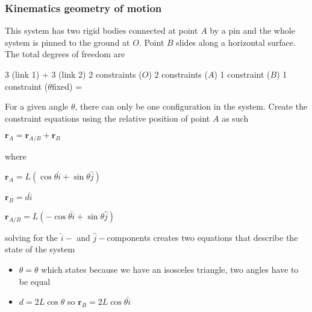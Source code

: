 \documentclass[letterpaper,10pt,english]{sphinxmanual}
\begin{document}


\subsubsection{Kinematics \sphinxhyphen{} geometry of motion}
\label{\detokenize{module_01/mechanical-advantage:kinematics-geometry-of-motion}}
This system has two rigid bodies connected at point \(A\) by a pin and the
whole system is pinned to the ground at \(O\). Point \(B\) slides
along a horizontal surface. The total degrees of freedom are

3 (link 1) + 3 (link 2) \sphinxhyphen{} 2 constraints (\(O\)) \sphinxhyphen{} 2 constraints (\(A\)) \sphinxhyphen{} 1
constraint (\(B\)) \sphinxhyphen{} 1 constraint (\(\theta\)\sphinxhyphen{}fixed) = 

For a given angle \(\theta\), there can only be one configuration in the
system. Create the constraint equations using the relative position of
point \(A\) as such

\(\mathbf{r}_A =  \mathbf{r}_{A/B} + \mathbf{r}_B\)


where

\(\mathbf{r}_A = L(\cos\theta \hat{i}+ \sin\theta \hat{j})\)

\(\mathbf{r}_B = d\hat{i}\)

\(\mathbf{r}_{A/B} = L(-\cos\theta \hat{i} + \sin\theta \hat{j})\)

solving for the \(\hat{i}-\) and \(\hat{j}-\)components creates two
equations that describe the state of the system
\begin{itemize}
\item {} 
\(\theta = \theta\) which states because we have an isosceles triangle,
two angles have to be equal

\item {} 
\(d = 2 L \cos\theta\) so \(\mathbf{r}_{B} = 2L \cos\theta \hat{i}\)

\end{itemize}
\end{document}
